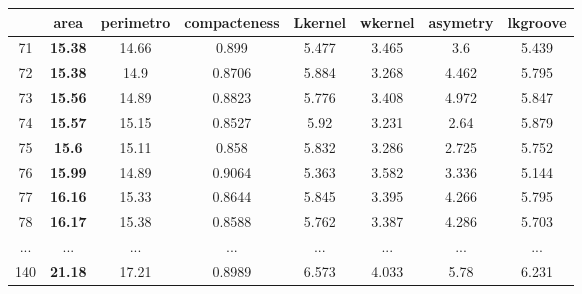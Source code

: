 \begin{table}[!ht]
{\begin{tabular}{|c|c|c|c|c|c|c|c|}
& \textbf{area} & perimetro & compacteness & Lkernel & wkernel & asymetry &lkgroove \\ \hline
\rowcolor[HTML]{EFEFEF} 
71 & \textbf{15.38} & 14.66 & 0.899 & 5.477 & 3.465 & 3.6 & 5.439\\ \hline 
\rowcolor[HTML]{EFEFEF}  
72 & \textbf{15.38} & 14.9 & 0.8706 & 5.884 & 3.268 & 4.462 & 5.795\\ \hline 
\rowcolor[HTML]{EFEFEF} 
73  & \textbf{15.56} & 14.89 & 0.8823 & 5.776 & 3.408 & 4.972 & 5.847\\ \hline 
\rowcolor[HTML]{EFEFEF} 
74 & \textbf{15.57} & 15.15 & 0.8527 & 5.92 & 3.231 & 2.64 & 5.879\\ \hline 
\rowcolor[HTML]{EFEFEF} 
75 & \textbf{15.6} & 15.11 & 0.858 & 5.832 & 3.286 & 2.725 & 5.752\\ \hline 
\rowcolor[HTML]{EFEFEF} 
76 & \textbf{15.99} & 14.89 & 0.9064 & 5.363 & 3.582 & 3.336 & 5.144\\ \hline 
77 & \textbf{16.16} & 15.33 & 0.8644 & 5.845 & 3.395 & 4.266 & 5.795\\ \hline 
78 & \textbf{16.17} & 15.38 & 0.8588 & 5.762 & 3.387 & 4.286 & 5.703\\ \hline 
... & ... & ... & ... & ... & ... & ... & ...\\ \hline 
140 & \textbf{21.18} & 17.21 & 0.8989 & 6.573 & 4.033 & 5.78 & 6.231\\ \hline 

\end{tabular}
    }
    
    \subfloat[Amostra de dados exibindo os 11 primeiro registros e simulando até o último, do \textit{cluster} 2]{ \label{tab:analise:seeds:cluster2:cart}
   \small\addtolength{\tabcolsep}{-2pt} 
   \begin{tabular}{|c|c|c|c|c|c|c|c|}
\hline


\end{tabular}}
\end{table}

